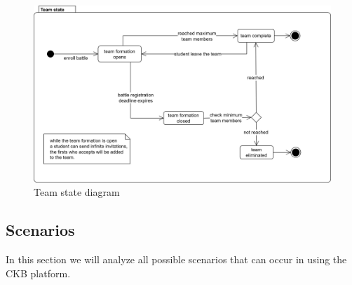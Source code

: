 \begin{figure}[H]
    \centering
    \includegraphics[scale=0.7]{images/team_state.png}
    \caption{Team state diagram}
    \label{fig:team_state}
\end{figure}
\clearpage

\subsection{Scenarios}\label{desc:scenarios}
In this section we will analyze all possible scenarios that can occur in using the CKB platform.

